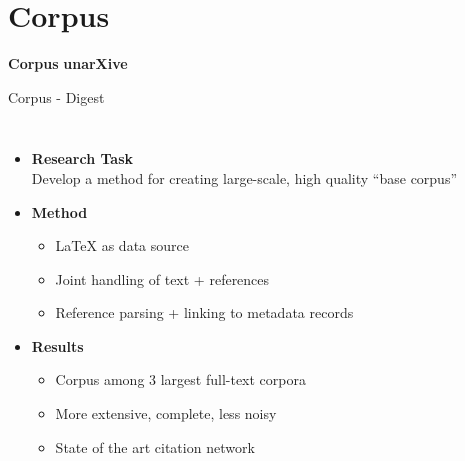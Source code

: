 \documentclass[en,16:9,smallfoot]{sdqbeamer}
\begin{document}
\section{Corpus}

   \begin{frame}[plain]
        \vspace{0.7cm}
        \begin{infobox-map}
        \centering
        \begin{Huge}
         {\textbf{Corpus}}
         {\textbf{\hphantom{C}unarXive\hphantom{C}}}
        \end{Huge}
        \end{infobox-map}
   \end{frame}

   \begin{frame}{Corpus - Digest}
   \begin{columns}
        \begin{itemize}
            \item \textbf{Research Task}\\Develop a method for creating large-scale, high quality ``base corpus''
            \item \textbf{Method}
            \begin{itemize}
                \item \LaTeX{} as data source
                \item Joint handling of text + references  %
                \item Reference parsing + linking to metadata records
            \end{itemize}
            \item \textbf{Results}
            \begin{itemize}
                \item Corpus among 3 largest full-text corpora
                \item More extensive, complete, less noisy
                \item State of the art citation network
            \end{itemize}
        \end{itemize}

\end{columns}
\end{frame}
\end{document}
